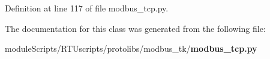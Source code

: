 Definition at line 117 of file modbus\+\_\+tcp.\+py.



The documentation for this class was generated from the following file\+:\begin{DoxyCompactItemize}
\item 
module\+Scripts/\+R\+T\+Uscripts/protolibs/modbus\+\_\+tk/{\bf modbus\+\_\+tcp.\+py}\end{DoxyCompactItemize}
